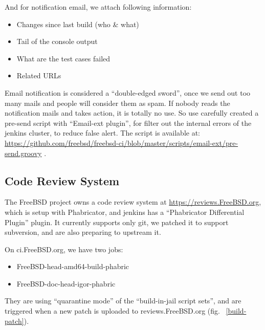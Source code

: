 \documentclass[a4paper,twocolumn,10pt]{article}
\begin{document}
And for notification email, we attach following information:
\begin{itemize}
\item Changes since last build (who \& what)
\item Tail of the console output
\item What are the test cases failed
\item Related URLs
\end{itemize}

Email notification is considered a ``double-edged sword'', once we send out too
many mails and people will consider them as spam. If nobody reads the
notification mails and takes action, it is totally no use. So use carefully
created a pre-send script with ``Email-ext plugin'', for filter out the
internal errors of the jenkins cluster, to reduce false alert. The script is
available at:
\url{https://github.com/freebsd/freebsd-ci/blob/master/scripts/email-ext/pre-send.groovy}
.

\subsection{Code Review System}

The FreeBSD project owns a code review system at \url{https://reviews.FreeBSD.org},
which is setup with Phabricator, and jenkins has a ``Phabricator Differential
Plugin'' plugin. It currently supports only git, we patched it to support
subversion, and are also preparing to upstream it.

On ci.FreeBSD.org, we have two jobs:

\begin{itemize}
\item FreeBSD-head-amd64-build-phabric
\item FreeBSD-doc-head-igor-phabric
\end{itemize}

They are using ``quarantine mode'' of the ``build-in-jail script sets'', and
are triggered when a new patch is uploaded to reviews.FreeBSD.org (fig.
~\ref{build-patch}).
\end{document}
